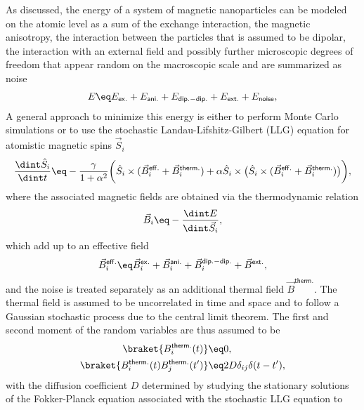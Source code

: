 \documentclass[\main/dresen_thesis.tex]{subfiles}
\begin{document}
    As discussed, the energy of a system of magnetic nanoparticles can be modeled on the atomic level as a sum of the exchange interaction, the magnetic anisotropy, the interaction between the particles that is assumed to be dipolar, the interaction with an external field and possibly further microscopic degrees of freedom that appear random on the macroscopic scale and are summarized as noise
    \begin{align}
      E \eq E_\mathsf{ex.} + E_\mathsf{ani.} + E_\mathsf{dip.-dip.} + E_\mathsf{ext.} + E_\mathsf{noise},
    \end{align}
    A general approach to minimize this energy is either to perform Monte Carlo simulations or to use the stochastic Landau-Lifshitz-Gilbert (LLG) equation \cite{Fidler_2000_Micro, Scholz_1999_Micro} for atomistic magnetic spins $\vec{S}_i$
    \begin{align}
      \frac{\dint \hat{S}_i}{\dint t} \eq
        - \frac{\gamma}{1 + \alpha^2} \biggl(
          \hat{S}_i \times (\vec{B}_i^\mathsf{eff.} + \vec{B}^\mathsf{therm.}_i) +
          \alpha \hat{S}_i \times \bigl(\hat{S}_i \times (\vec{B}_i^\mathsf{eff.} +\vec{B}^\mathsf{therm.}_i) \bigr) \biggr),
    \end{align}
    where the associated magnetic fields are obtained via the thermodynamic relation
    \begin{align}
      \vec{B}_i \eq - \frac{\dint E}{\dint \vec{S}_i},
    \end{align}
    which add up to an effective field
    \begin{align}
      \vec{B}^\mathsf{eff.}_i \eq \vec{B}^\mathsf{ex.}_i + \vec{B}^\mathsf{ani.}_i + \vec{B}^\mathsf{dip.-dip.}_i + \vec{B}^\mathsf{ext.},
    \end{align}
    and the noise is treated separately as an additional thermal field $\vec{B}^\mathsf{therm.}$.
    The thermal field is assumed to be uncorrelated in time and space and to follow a Gaussian stochastic process due to the central limit theorem.
    The first and second moment of the random variables are thus assumed to be
    \begin{align}
      \braket{B^\mathsf{therm.}_i (t)} &\eq 0,\\
      \braket{B^\mathsf{therm.}_i (t) B^\mathsf{therm.}_j (t^\prime)} &\eq 2 D \delta_{ij} \delta(t - t^\prime),
    \end{align}
    with the diffusion coefficient $D$ determined by studying the stationary solutions of the Fokker-Planck equation associated with the stochastic LLG equation to \cite{Garcia_1998_Lange}
\end{document}
